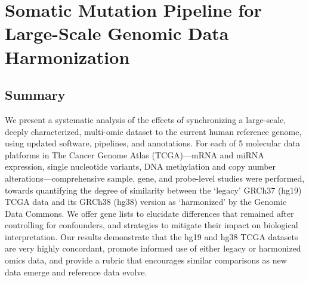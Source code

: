 \chapter{Somatic Mutation Pipeline for Large-Scale Genomic Data Harmonization}
\label{chap:mut-pipeline-qc}




\section{Summary}
We present a systematic analysis of the effects of synchronizing a large-scale, deeply characterized, multi-omic dataset to the current human reference genome, using updated software, pipelines, and annotations.
For each of 5 molecular data platforms in The Cancer Genome Atlas (TCGA)---mRNA and miRNA expression, single nucleotide variants, DNA methylation and copy number alterations---comprehensive sample, gene, and probe-level studies were performed, towards quantifying the degree of similarity between the \enquote*{legacy} GRCh37 (hg19) TCGA data and its GRCh38 (hg38) version as \enquote*{harmonized} by the Genomic Data Commons.
We offer gene lists to elucidate differences that remained after controlling for confounders, and strategies to mitigate their impact on biological interpretation.
Our results demonstrate that the hg19 and hg38 TCGA datasets are very highly concordant, promote informed use of either legacy or harmonized omics data, and provide a rubric that encourages similar comparisons as new data emerge and reference data evolve.


